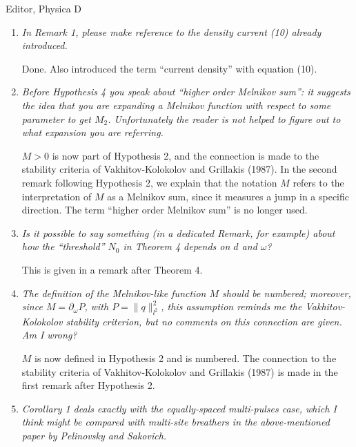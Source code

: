 \documentclass[11pt]{letter}
\begin{document}
\begin{letter}{Editor, Physica D}
\begin{enumerate}
\item \emph{In Remark 1, please make reference to the density current (10) already introduced.}

\vspace{4mm}
Done. Also introduced the term ``current density'' with equation (10).
\vspace{4mm}

\item \emph{Before Hypothesis 4 you speak about ``higher order Melnikov sum'': it suggests the idea that you are expanding a Melnikov function with respect to some parameter to get $M_2$. Unfortunately the reader is not helped to figure out to what expansion you are referring.}

\vspace{4mm}
$M > 0$ is now part of Hypothesis 2, and the connection is made to the stability criteria of Vakhitov-Kolokolov and Grillakis (1987). In the second remark following Hypothesis 2, we explain that the notation $M$ refers to the interpretation of $M$ as a Melnikov sum, since it measures a jump in a specific direction. The term ``higher order Melnikov sum'' is no longer used.

\vspace{4mm}

\item \emph{Is it possible to say something (in a dedicated Remark, for example) about how the ``threshold'' $N_0$ in Theorem 4 depends on $d$ and $\omega$?}

\vspace{4mm}
This is given in a remark after Theorem 4.
\vspace{4mm}

\item \emph{The definition of the Melnikov-like function $M$ should be numbered; moreover, since $M = \partial_\omega P$, with $P = \|q\|_{l^2}^2$, this assumption reminds me the Vakhitov-Kolokolov stability criterion, but no comments on this connection are given. Am I wrong?}

\vspace{4mm}
$M$ is now defined in Hypothesis 2 and is numbered. The connection to the stability criteria of Vakhitov-Kolokolov and Grillakis (1987) is made in the first remark after Hypothesis 2.
\vspace{4mm}

\item \emph{Corollary 1 deals exactly with the equally-spaced multi-pulses case, which I think might be compared with multi-site breathers in the above-mentioned paper by Pelinovsky and Sakovich.}


\end{enumerate}
\end{letter}
\end{document}
